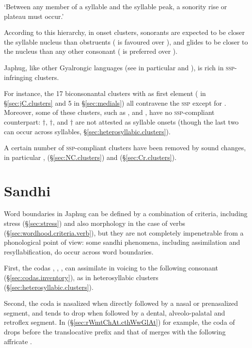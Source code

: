 \begin{exe}
	\ex \label{ex:ssp}
	\glt `Between any member of a syllable and the syllable peak, a sonority
	rise or plateau must occur.'
\end{exe}

According to this hierarchy, in onset clusters, sonorants are expected to be closer the syllable nucleus than obstruents ( is favoured over ), and glides to be closer to the nucleus than any other consonant ( is preferred over ).

Japhug, like other Gyalrongic languages (see in particular \citealt{jackson00puxi} and \citealt[73]{lai17khroskyabs}), is rich in \textsc{ssp}-infringing clusters. 


For instance, the 17 biconsonantal clusters with  as first element ( in §\ref{sec:jC.clusters} and 5 in §\ref{sec:medials}) all contravene the \textsc{ssp} except for . Moreover, some of these clusters, such as ,  and , have no \textsc{ssp}-compliant counterpart: $\dagger$, $\dagger$,  and $\dagger$ are not attested as syllable onsets (though the last two can occur across syllables, §\ref{sec:heterosyllabic.clusters}). 

A certain number of \textsc{ssp}-compliant clusters have been removed by sound changes, in particular  \fl{} ,  \fl{}  (§\ref{sec:NC.clusters}) and   \fl{}  (§\ref{sec:Cr.clusters}).


\section{Sandhi} \label{sec:sandhi.word}
Word boundaries in Japhug can be defined by a combination of criteria, including stress (§\ref{sec:stress}) and also morphology in the case of verbs (§\ref{sec:wordhood.criteria.verb}), but they are not completely impenetrable from a phonological point of view: some sandhi phenomena, including assimilation and resyllabification, do occur across word boundaries.

First, the codas ,  , ,  can assimilate in voicing to the following consonant (§\ref{sec:codas.inventory}), as in heterosyllabic clusters (§\ref{sec:heterosyllabic.clusters}).

Second, the coda  is nasalized when directly followed by a nasal or prenasalized segment, and tends to drop when followed by a dental, alveolo-palatal and retroflex segment. In (§\ref{sec:rWmtChAt.cthWwGlAt}) for example, the  coda of  drops before the  translocative prefix and that of  merges with the following affricate .

